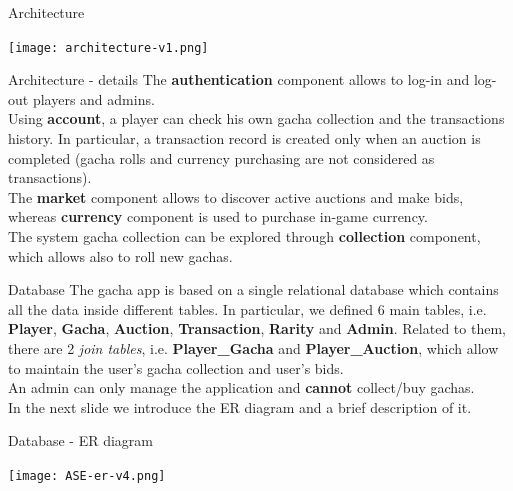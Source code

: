 \documentclass[12pt,aspectratio=169,notheorems]{beamer}
\begin{document}
\begin{frame}{Architecture}
    \begin{center}
        \texttt{[image: architecture-v1.png]}
    \end{center}
\end{frame}

\begin{frame}{Architecture - details}
    The \textbf{authentication} component allows to log-in and log-out players and admins. \\[1ex]
    Using \textbf{account}, a player can check his own gacha collection and the transactions history. In particular, a transaction record is created only when an auction is completed (gacha rolls and currency purchasing are not considered as transactions). \\[1ex]
    The \textbf{market} component allows to discover active auctions and make bids, whereas \textbf{currency} component is used to purchase in-game currency. \\[1ex]
    The system gacha collection can be explored through \textbf{collection} component, which allows also to roll new gachas.
\end{frame}

\begin{frame}{Database}
    The gacha app is based on a single relational database which contains all the data inside different tables. In particular, we defined 6 main tables, i.e. \textbf{Player}, \textbf{Gacha}, \textbf{Auction}, \textbf{Transaction}, \textbf{Rarity} and \textbf{Admin}. Related to them, there are 2 \emph{join tables}, i.e. \textbf{Player\_Gacha} and \textbf{Player\_Auction}, which allow to maintain the user's gacha collection and user's bids. \\[1ex]
    An admin can only manage the application and \textbf{cannot} collect/buy gachas. \\[1ex]
    In the next slide we introduce the ER diagram and a brief description of it.  
\end{frame}

\begin{frame}{Database - ER diagram}
    \begin{center}
        \texttt{[image: ASE-er-v4.png]}
    \end{center}
\end{frame}
\end{document}
